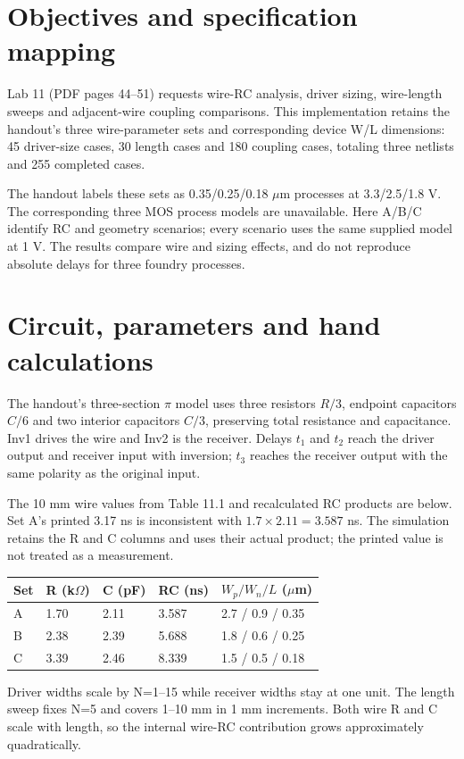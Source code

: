 \section{Objectives and specification mapping}
Lab 11 (PDF pages 44--51) requests wire-RC analysis, driver sizing, wire-length sweeps and adjacent-wire coupling comparisons. This implementation retains the handout's three wire-parameter sets and corresponding device W/L dimensions: 45 driver-size cases, 30 length cases and 180 coupling cases, totaling three netlists and 255 completed cases.

The handout labels these sets as 0.35/0.25/0.18 $\mu$m processes at 3.3/2.5/1.8 V. The corresponding three MOS process models are unavailable. Here A/B/C identify RC and geometry scenarios; every scenario uses the same supplied model at 1 V. The results compare wire and sizing effects, and do not reproduce absolute delays for three foundry processes.

\section{Circuit, parameters and hand calculations}
The handout's three-section $\pi$ model uses three resistors $R/3$, endpoint capacitors $C/6$ and two interior capacitors $C/3$, preserving total resistance and capacitance. Inv1 drives the wire and Inv2 is the receiver. Delays $t_1$ and $t_2$ reach the driver output and receiver input with inversion; $t_3$ reaches the receiver output with the same polarity as the original input.

The 10 mm wire values from Table 11.1 and recalculated RC products are below. Set A's printed 3.17 ns is inconsistent with $1.7\times2.11=3.587$ ns. The simulation retains the R and C columns and uses their actual product; the printed value is not treated as a measurement.

\begin{center}\small
\begin{tabular}{lllll}
\toprule
Set & R (k$\Omega$) & C (pF) & RC (ns) & $W_p/W_n/L$ ($\mu$m) \\
\midrule
A & 1.70 & 2.11 & 3.587 & 2.7 / 0.9 / 0.35 \\
B & 2.38 & 2.39 & 5.688 & 1.8 / 0.6 / 0.25 \\
C & 3.39 & 2.46 & 8.339 & 1.5 / 0.5 / 0.18 \\
\bottomrule
\end{tabular}
\end{center}
Driver widths scale by N=1--15 while receiver widths stay at one unit. The length sweep fixes N=5 and covers 1--10 mm in 1 mm increments. Both wire R and C scale with length, so the internal wire-RC contribution grows approximately quadratically.

